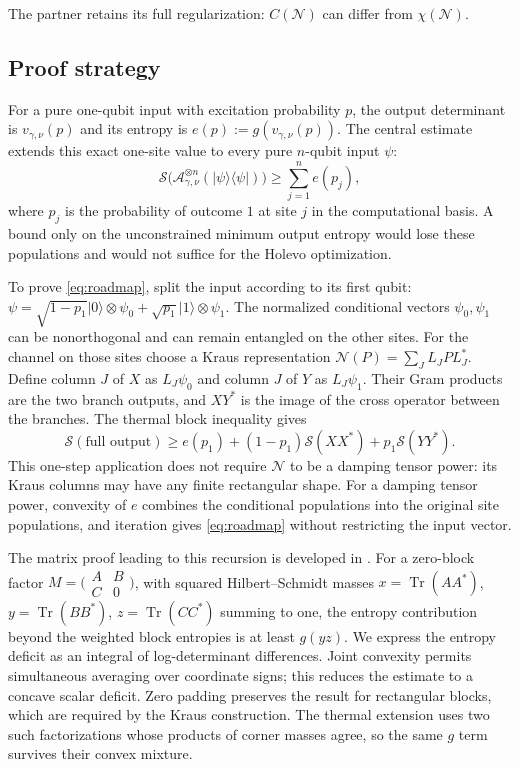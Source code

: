 \documentclass[11pt]{article}
\theoremstyle{remark}
\DeclareMathOperator{\Tr}{Tr}
\newcommand{\A}{\mathcal A}
\newcommand{\ent}{\mathcal S}
\newcommand{\ket}[1]{\lvert #1\rangle}
\newcommand{\bra}[1]{\langle #1\rvert}
\newcommand{\proj}[1]{\ket{#1}\bra{#1}}
\numberwithin{equation}{section}
\begin{document}
The partner retains its full regularization: $C(\mathcal N)$ can differ
from $\chi(\mathcal N)$.

\subsection{Proof strategy}

For a pure one-qubit input with excitation probability $p$, the output
determinant is $v_{\gamma,\nu}(p)$ and its entropy is
$e(p):=g(v_{\gamma,\nu}(p))$. The central estimate extends this exact
one-site value to every pure $n$-qubit input $\psi$:
\begin{equation}\label{eq:roadmap}
 \ent\bigl(\A_{\gamma,\nu}^{\otimes n}(\proj\psi)\bigr)
 \ge\sum_{j=1}^n e(p_j),
\end{equation}
where $p_j$ is the probability of outcome $1$ at site $j$ in the
computational basis. A bound only on the unconstrained minimum output
entropy would lose these populations and would not suffice for the
Holevo optimization.

To prove \eqref{eq:roadmap}, split the input according to its first
qubit:
$\psi=\sqrt{1-p_1}\ket0\otimes\psi_0+
\sqrt{p_1}\ket1\otimes\psi_1$.
The normalized conditional vectors $\psi_0,\psi_1$ can be nonorthogonal
and can remain entangled on the other sites. For the channel on those
sites choose a Kraus representation $\mathcal N(P)=\sum_J L_JPL_J^*$.
Define column $J$ of $X$ as $L_J\psi_0$ and column $J$ of $Y$ as
$L_J\psi_1$. Their Gram products are the two branch
outputs, and $XY^*$ is the image of the cross operator between the
branches. The thermal block inequality gives
\[
 \ent(\text{full output})\ge e(p_1)
 +(1-p_1)\ent(XX^*)+p_1\ent(YY^*).
\]
This one-step application does not require $\mathcal N$ to be a damping
tensor power: its Kraus columns may have any finite rectangular shape.
For a damping tensor power, convexity of $e$ combines the conditional
populations into the original site populations, and iteration gives
\eqref{eq:roadmap} without restricting the input vector.

The matrix proof leading to this recursion is developed in
. For a zero-block factor
$M=\bigl(\begin{smallmatrix}A&B\\ C&0\end{smallmatrix}\bigr)$, with
squared Hilbert--Schmidt masses
$x=\Tr(AA^*)$, $y=\Tr(BB^*)$, $z=\Tr(CC^*)$ summing to one, the entropy
contribution beyond the weighted block entropies is at least $g(yz)$.
We express the entropy deficit as an integral of log-determinant
differences. Joint convexity permits simultaneous averaging over
coordinate signs; this reduces the estimate to a concave scalar
deficit. Zero padding preserves the result for rectangular blocks,
which are required by the Kraus construction. The thermal extension
uses two such factorizations whose products of corner masses agree,
so the same $g$ term survives their convex mixture.
\end{document}
